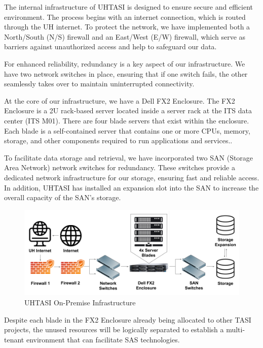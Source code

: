 The internal infrastructure of UHTASI is designed to ensure secure and efficient environment. The process begins with an internet connection, which is routed through the UH internet. To protect the network, we have implemented both a North/South (N/S) firewall and an East/West (E/W) firewall, which serve as barriers against unauthorized access and help to safeguard our data.

For enhanced reliability, redundancy is a key aspect of our infrastructure. We have two network switches in place, ensuring that if one switch fails, the other seamlessly takes over to maintain uninterrupted connectivity.

At the core of our infrastructure, we have a Dell FX2 Enclosure. The FX2 Enclosure is a 2U rack-based server located inside a server rack at the ITS data center (ITS M01). There are four blade servers that exist within the enclosure. Each blade is a self-contained server that contains one or more CPUs, memory, storage, and other components required to run applications and services..

To facilitate data storage and retrieval, we have incorporated two SAN (Storage Area Network) network switches for redundancy. These switches provide a dedicated network infrastructure for our storage, ensuring fast and reliable access. In addition, UHTASI has installed an expansion slot into the SAN to increase the overall capacity of the SAN's storage. 

\begin{figure}[H]
    \centering
    \includegraphics[scale = 0.65]{images/UHTASI Infrastructure.png}
    \caption{UHTASI On-Premise Infrastructure}
    \label{UHTASI-INF}
\end{figure}

Despite each blade in the FX2 Enclosure already being allocated to other TASI projects, the unused resources will be logically separated to establish a multi-tenant environment that can facilitate SAS technologies.

